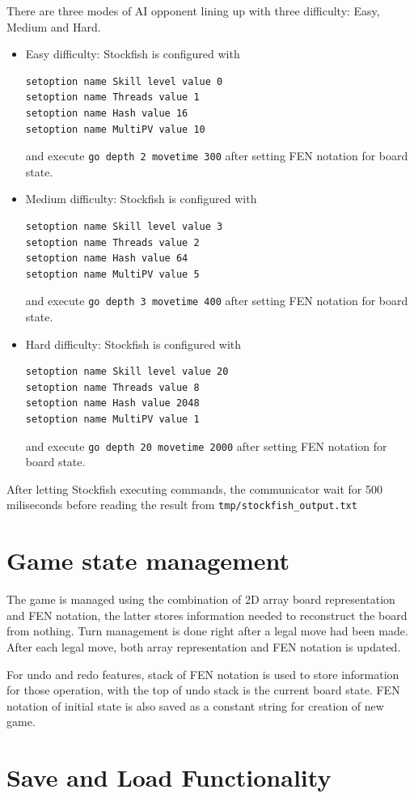 \documentclass[a4paper, 10pt, titlepage]{report}
\begin{document}
There are three modes of AI opponent lining up with three difficulty: Easy, Medium and Hard.
\begin{itemize}
  \item Easy difficulty: Stockfish is configured with \begin{verbatim}
setoption name Skill level value 0
setoption name Threads value 1     
setoption name Hash value 16      
setoption name MultiPV value 10    
\end{verbatim} and execute \texttt{go depth 2 movetime 300} after setting FEN notation for board state.
  \item Medium difficulty: Stockfish is configured with \begin{verbatim}
setoption name Skill level value 3
setoption name Threads value 2     
setoption name Hash value 64      
setoption name MultiPV value 5    
\end{verbatim} and execute \texttt{go depth 3 movetime 400} after setting FEN notation for board state.
  \item Hard difficulty: Stockfish is configured with \begin{verbatim}
setoption name Skill level value 20
setoption name Threads value 8     
setoption name Hash value 2048      
setoption name MultiPV value 1    
\end{verbatim} and execute \texttt{go depth 20 movetime 2000} after setting FEN notation for board state.
\end{itemize}
After letting Stockfish executing commands, the communicator wait for 500 miliseconds before reading the result from \texttt{tmp/stockfish\_output.txt}
\section{Game state management}
The game is managed using the combination of 2D array board representation and FEN notation, the latter stores information needed to reconstruct the board from nothing. Turn management is done right after a legal move had been made. After each legal move, both array representation and FEN notation is updated.

For undo and redo features, stack of FEN notation is used to store information for those operation, with the top of undo stack is the current board state. FEN notation of initial state is also saved as a constant string for creation of new game.

\section{Save and Load Functionality}
\end{document}

